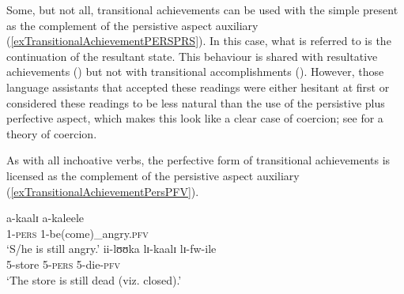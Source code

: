 Some, but not all, transitional achievements can be used with the simple present as the complement of the persistive aspect auxiliary (\ref{exTransitionalAchievementPERSPRS}). In this case, what is referred to is the continuation of the resultant state. This behaviour is shared with resultative achievements () but not with transitional accomplishments (). However, those language assistants that accepted these readings were either hesitant at first or considered these readings to be less natural than the use of the persistive plus perfective aspect, which makes this look like a clear case of coercion; see \citet{MichaelisL2004} for a theory of coercion.

\begin{exe}
\ex \label{exTransitionalAchievementPERSPRS}\begin{xlist}
\end{xlist}
\end{exe}

As with all inchoative verbs, the perfective form of transitional achievements is licensed as the complement of the persistive aspect auxiliary (\ref{exTransitionalAchievementPersPFV}).
\begin{exe}
\ex \label{exTransitionalAchievementPersPFV}\begin{xlist}
\ex\gll a-kaalɪ a-kaleele\\
1-\textsc{pers} 1-be(come)\_angry.\textsc{pfv}\\
\glt `S/he is still angry.'
\ex \gll ii-lʊʊka lɪ-kaalɪ lɪ-fw-ile\\
5-store 5-\textsc{pers} 5-die-\textsc{pfv}\\
\glt `The store is still dead (viz. closed).'
\end{xlist}
\end{exe}

